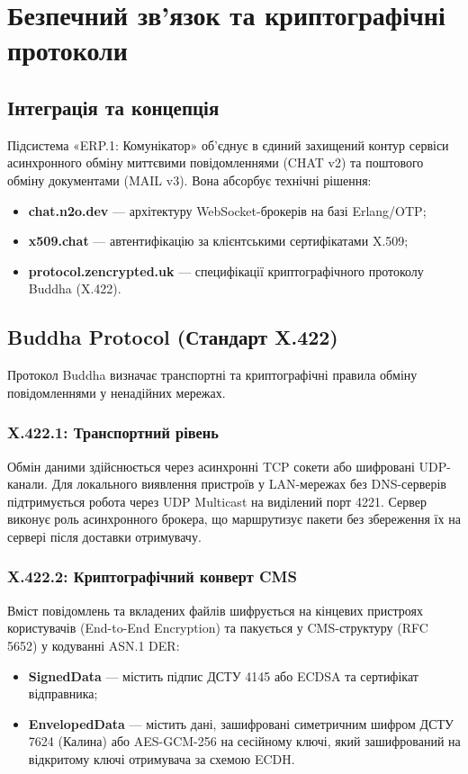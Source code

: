 \chapter{Безпечний зв'язок та криптографічні протоколи}

\section{Інтеграція та концепція}
Підсистема «ERP.1: Комунікатор» об'єднує в єдиний захищений контур сервіси асинхронного обміну миттєвими повідомленнями (CHAT v2) та поштового обміну документами (MAIL v3). Вона абсорбує технічні рішення:
\begin{itemize}
    \item \textbf{chat.n2o.dev} --- архітектуру WebSocket-брокерів на базі Erlang/OTP;
    \item \textbf{x509.chat} --- автентифікацію за клієнтськими сертифікатами X.509;
    \item \textbf{protocol.zencrypted.uk} --- специфікації криптографічного протоколу Buddha (X.422).
\end{itemize}

\section{Buddha Protocol (Стандарт X.422)}
Протокол Buddha визначає транспортні та криптографічні правила обміну повідомленнями у ненадійних мережах.

\subsection{X.422.1: Транспортний рівень}
Обмін даними здійснюється через асинхронні TCP сокети або шифровані UDP-канали. Для локального виявлення пристроїв у LAN-мережах без DNS-серверів підтримується робота через UDP Multicast на виділений порт 4221. Сервер виконує роль асинхронного брокера, що маршрутизує пакети без збереження їх на сервері після доставки отримувачу.

\subsection{X.422.2: Криптографічний конверт CMS}
Вміст повідомлень та вкладених файлів шифрується на кінцевих пристроях користувачів (End-to-End Encryption) та пакується у CMS-структуру (RFC 5652) у кодуванні ASN.1 DER:
\begin{itemize}
    \item \textbf{SignedData} --- містить підпис ДСТУ 4145 або ECDSA та сертифікат відправника;
    \item \textbf{EnvelopedData} --- містить дані, зашифровані симетричним шифром ДСТУ 7624 (Калина) або AES-GCM-256 на сесійному ключі, який зашифрований на відкритому ключі отримувача за схемою ECDH.
\end{itemize}

